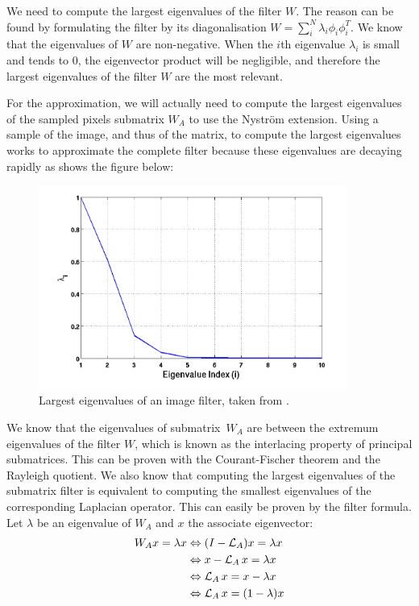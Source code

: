 We need to compute the largest eigenvalues of the filter \(W\).
The reason can be found by formulating the filter by its diagonalisation \(W = \sum_i^N \lambda_i \phi_i \phi_i^T\).
We know that the eigenvalues of \(W\) are non-negative.
When the \(i\)th eigenvalue \(\lambda_i\) is small and tends to 0, the eigenvector product will be negligible, and therefore the largest eigenvalues of the filter \(W\) are the most relevant.

For the approximation, we will actually need to compute the largest eigenvalues of the sampled pixels submatrix \(W_A\) to use the Nystr\"om extension.
Using a sample of the image, and thus of the matrix, to compute the largest eigenvalues works to approximate the complete filter because these eigenvalues are decaying rapidly as shows the figure below:
\begin{figure}[H]
  \centering
  \includegraphics[width=0.9\textwidth]{img/decayingEigenvalues.png}
  \caption{Largest eigenvalues of an image filter, taken from \cite{siam_slides_2016}.}
\end{figure}

We know that the eigenvalues of submatrix\ \(W_A\) are between the extremum eigenvalues of the filter \(W\), which is known as the interlacing property of principal submatrices.
This can be proven with the Courant-Fischer theorem and the Rayleigh quotient.
We also know that computing the largest eigenvalues of the submatrix filter is equivalent to computing the smallest eigenvalues of the corresponding Laplacian operator.
This can easily be proven by the filter formula.
Let \(\lambda\) be an eigenvalue of \(W_A\) and \(x\) the associate eigenvector:
\begin{equation}
 \begin{split}
     W_A x = \lambda x & \Leftrightarrow (I - \operatorname{\mathcal{L}}_A)x = \lambda x \\
                     & \Leftrightarrow x - \operatorname{\mathcal{L}}_A x = \lambda x \\
                     & \Leftrightarrow \operatorname{\mathcal{L}}_A x = x - \lambda x \\
                     & \Leftrightarrow \operatorname{\mathcal{L}}_A x = (1 - \lambda) x
 \end{split}
\end{equation}

